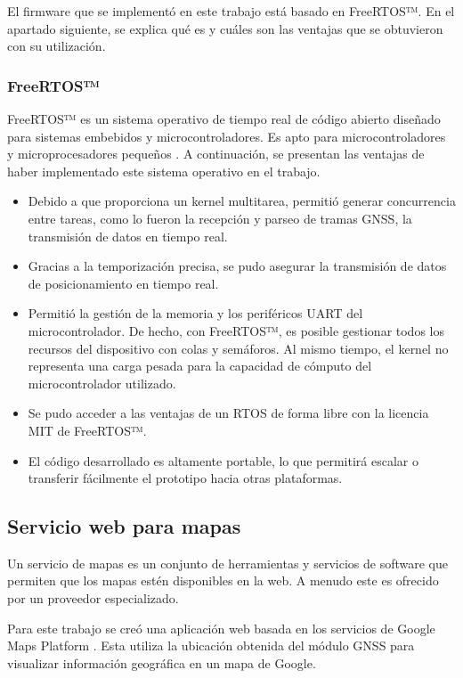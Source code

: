 El firmware que se implementó en este trabajo está basado en FreeRTOS™. En el apartado siguiente, se explica qué es y cuáles son las ventajas que se obtuvieron con su utilización. 

\subsubsection{FreeRTOS™}
\label{sec:FreeRTOS}

FreeRTOS™ es un sistema operativo de tiempo real de código abierto diseñado para sistemas embebidos y microcontroladores. Es apto para microcontroladores y microprocesadores pequeños \citep{FreeRTOS}. A continuación, se presentan las ventajas de haber implementado este sistema operativo en el trabajo.

\begin{itemize}
    \item Debido a que proporciona un kernel multitarea, permitió generar concurrencia entre tareas, como lo fueron la recepción y parseo de tramas GNSS, la transmisión de datos en tiempo real.  
    \item Gracias a la temporización precisa, se pudo asegurar la transmisión de datos de posicionamiento en tiempo real. 
    \item Permitió la gestión de la memoria y los periféricos UART del microcontrolador. De hecho, con FreeRTOS™, es posible gestionar todos los recursos del dispositivo con colas y semáforos. Al mismo tiempo, el kernel no representa una carga pesada para la capacidad de cómputo del microcontrolador utilizado. 
    \item Se pudo acceder a las ventajas de un RTOS de forma libre con la licencia MIT de FreeRTOS™.
    \item El código desarrollado es altamente portable, lo que permitirá escalar o transferir fácilmente el prototipo hacia otras plataformas. 
\end{itemize}



\subsection{Servicio web para mapas}
\label{sec:mapas_web}

Un servicio de mapas es un conjunto de herramientas y servicios de software que permiten que los mapas estén disponibles en la web. A menudo este es ofrecido por un proveedor especializado. 

Para este trabajo se creó una aplicación web basada en los servicios de Google Maps Platform \citep{GoogleMaps}. Esta utiliza la ubicación obtenida del módulo GNSS para visualizar información geográfica en un mapa de Google. 